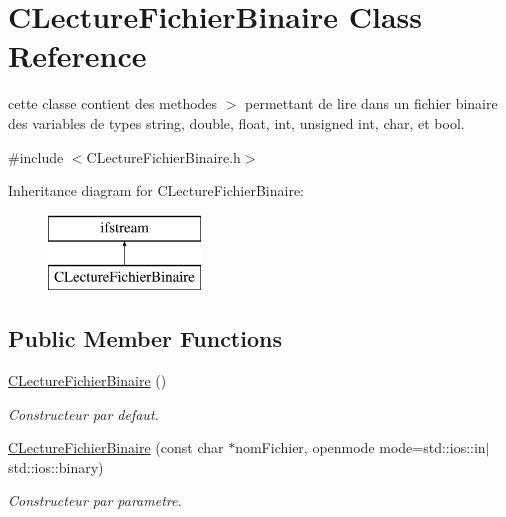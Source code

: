 \hypertarget{class_c_lecture_fichier_binaire}{\section{C\-Lecture\-Fichier\-Binaire Class Reference}
\label{class_c_lecture_fichier_binaire}
}


cette classe contient des methodes $>$ permettant de lire dans un fichier binaire des variables de types string, double, float, int, unsigned int, char, et bool.  




{\ttfamily \#include $<$C\-Lecture\-Fichier\-Binaire.\-h$>$}

Inheritance diagram for C\-Lecture\-Fichier\-Binaire\-:\begin{figure}[H]
\begin{center}
\leavevmode
\includegraphics[height=2.000000cm]{class_c_lecture_fichier_binaire}
\end{center}
\end{figure}
\subsection*{Public Member Functions}
\begin{DoxyCompactItemize}
\item 
\hyperlink{group__utilitaire_ga3a259905a2c14513846e6ecb8cf476ad}{C\-Lecture\-Fichier\-Binaire} ()
\begin{DoxyCompactList}\small\item\em Constructeur par defaut. \end{DoxyCompactList}\item 
\hyperlink{group__utilitaire_gac16ebab7b172408c2ba14605f61f0f84}{C\-Lecture\-Fichier\-Binaire} (const char $\ast$nom\-Fichier, openmode mode=std\-::ios\-::in$\vert$std\-::ios\-::binary)
\begin{DoxyCompactList}\small\item\em Constructeur par parametre. \end{DoxyCompactList}\end{DoxyCompactItemize}
